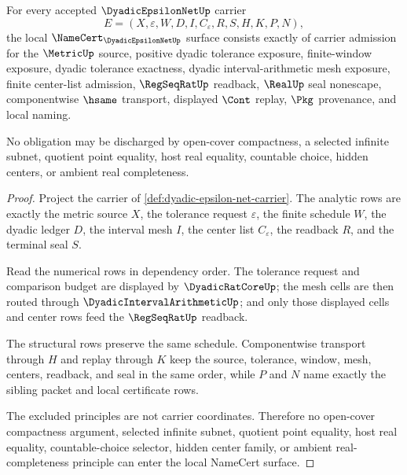 \begin{theorem}
\label{thm:dyadic-epsilon-net-namecert-obligations}
For every accepted $\DyadicEpsilonNetUp$ carrier
$$
E=(X,\varepsilon,W,D,I,C_{\varepsilon},R,S,H,K,P,N),
$$
the local $\NameCert_{\DyadicEpsilonNetUp}$ surface consists exactly of carrier admission for the $\MetricUp$ source, positive dyadic tolerance exposure, finite-window exposure, dyadic tolerance exactness, dyadic interval-arithmetic mesh exposure, finite center-list admission, $\RegSeqRatUp$ readback, $\RealUp$ seal nonescape, componentwise $\hsame$ transport, displayed $\Cont$ replay, $\Pkg$ provenance, and local naming.

No obligation may be discharged by open-cover compactness, a selected infinite subnet, quotient point equality, host real equality, countable choice, hidden centers, or ambient real completeness.
\end{theorem}
\begin{proof}
Project the carrier of \autoref{def:dyadic-epsilon-net-carrier}. The analytic rows are exactly the metric source $X$, the tolerance request $\varepsilon$, the finite schedule $W$, the dyadic ledger $D$, the interval mesh $I$, the center list $C_{\varepsilon}$, the readback $R$, and the terminal seal $S$.

Read the numerical rows in dependency order. The tolerance request and comparison budget are displayed by $\DyadicRatCoreUp$; the mesh cells are then routed through $\DyadicIntervalArithmeticUp$; and only those displayed cells and center rows feed the $\RegSeqRatUp$ readback.

The structural rows preserve the same schedule. Componentwise transport through $H$ and replay through $K$ keep the source, tolerance, window, mesh, centers, readback, and seal in the same order, while $P$ and $N$ name exactly the sibling packet and local certificate rows.

The excluded principles are not carrier coordinates. Therefore no open-cover compactness argument, selected infinite subnet, quotient point equality, host real equality, countable-choice selector, hidden center family, or ambient real-completeness principle can enter the local NameCert surface.
\end{proof}

